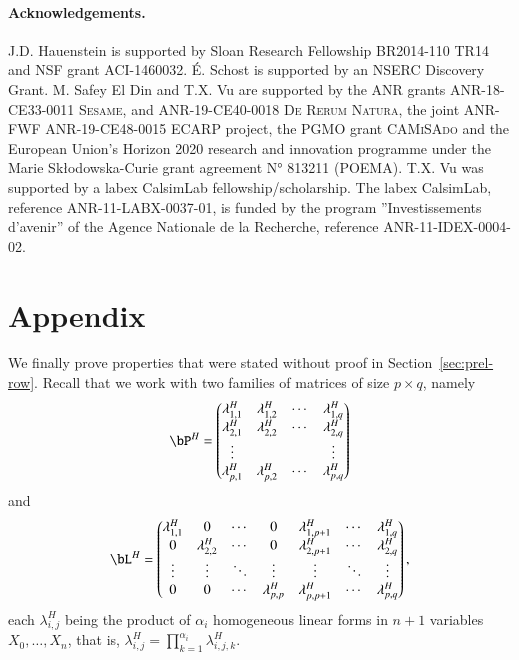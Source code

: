 \documentclass[amsthm]{elsart}
\begin{document}
\paragraph*{Acknowledgements.} J.D. Hauenstein is supported by Sloan Research
Fellowship BR2014-110 TR14 and NSF grant ACI-1460032. \'E. Schost is supported
by an NSERC Discovery Grant. M. Safey El Din and T.X. Vu are supported
by the ANR grants ANR-18-CE33-0011 \textsc{Sesame}, and ANR-19-CE40-0018
\textsc{De Rerum Natura}, the joint ANR-FWF ANR-19-CE48-0015 \textsc{ECARP}
project, the PGMO grant \textsc{CAMiSAdo} and the European Union’s Horizon 2020
research and innovation programme under the Marie Skłodowska-Curie grant
agreement N° 813211 (POEMA). T.X. Vu was supported by a labex CalsimLab
fellowship/scholarship. The labex CalsimLab, reference ANR-11-LABX-0037-01, is
funded by the program ''Investissements d'avenir'' of the Agence Nationale de la
Recherche, reference ANR-11-IDEX-0004-02.

\vspace{-0.5cm}


\appendix
\section{Appendix}\label{appendix}

We finally prove properties that were stated without proof in
Section~\ref{sec:prel-row}.  Recall that we work with two families of
matrices of size $p \times q$, namely
\begin{align}\label{eqdef:type2b}
\bP^H= \left( \begin{matrix}
\lambda^H_{1,1} & \lambda^H_{1,2} & \cdots & \lambda^H_{1, q}\\
 \lambda^H_{2,1} &  \lambda^H_{2,2} & \cdots & \lambda^H_{2, q}\\
 \vdots & & & \vdots\\
 \lambda^H_{p,1} &  \lambda^H_{p,2}& \cdots & \lambda^H_{p, q}
\end{matrix} \right)
\end{align}
and
\begin{align}\label{eqdef:type1b}
\bL^H= \left( \begin{matrix}
\lambda^H_{1,1} & 0 & \cdots & 0 & \lambda^H_{1,p+1} & \cdots & \lambda^H_{1, q}\\
0 & \lambda^H_{2,2} & \cdots & 0 & \lambda^H_{2,p+1} & \cdots & \lambda^H_{2, q}\\
\vdots & \vdots & \ddots & \vdots & \vdots & \ddots & \vdots\\
0 & 0 & \cdots & \lambda^H_{p,p} & \lambda^H_{p,p+1} & \cdots & \lambda^H_{p, q}
\end{matrix} \right),
\end{align}
each $\lambda^H_{i,j}$ being the product of $\alpha_i$ homogeneous
linear forms in $n+1$ variables $X_0,\dots,X_n$, that is,
$\lambda^H_{i,j}=\prod_{k=1}^{\alpha_i} \lambda^H_{i,j,k}$.
\end{document}
